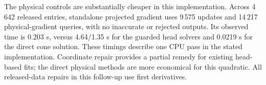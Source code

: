 The physical controls are substantially cheaper in this implementation. Across 4\,642 released entries, standalone projected gradient uses 9\,575 updates and 14\,217 physical-gradient queries, with no inaccurate or rejected outputs. Its observed time is 0.203 s, versus 4.64/1.35 s for the guarded head solvers and 0.0219 s for the direct cone solution. These timings describe one CPU pass in the stated implementation. Coordinate repair provides a partial remedy for existing head-based fits; the direct physical methods are more economical for this quadratic. All released-data repairs in this follow-up use first derivatives.
